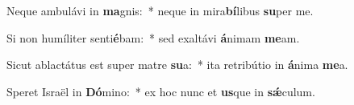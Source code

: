 \item Neque ambulávi in \textbf{ma}gnis:~* neque in mira\textbf{bí}libus \textbf{su}per me.
\item Si non humíliter senti\textbf{é}bam:~* sed exaltávi \textbf{á}nimam \textbf{me}am.
\item Sicut ablactátus est super matre \textbf{su}a:~* ita retribútio in \textbf{á}nima \textbf{me}a.
\item Speret Israël in \textbf{Dó}mino:~* ex hoc nunc et \textbf{us}que in \textbf{sǽ}culum.

